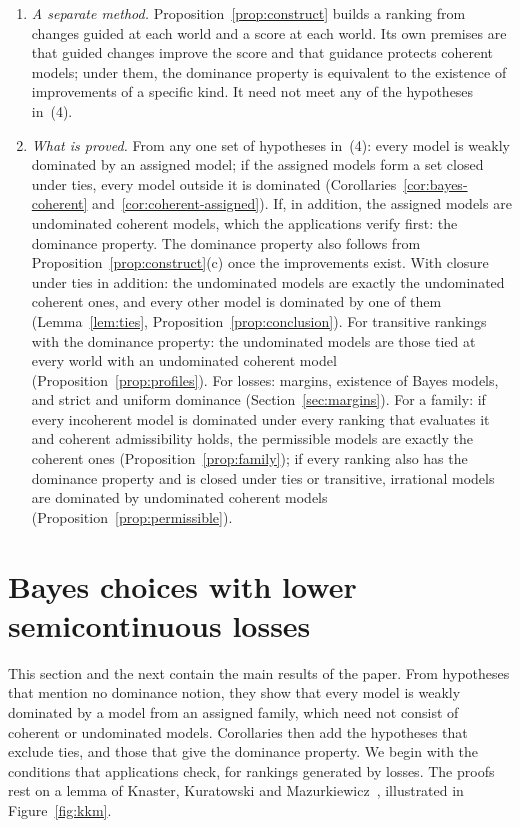 \documentclass[11pt]{article}
\theoremstyle{definition}
\theoremstyle{remark}
\begin{document}
\begin{enumerate}[label=(\arabic*),leftmargin=*]
\item \emph{A separate method.} Proposition~\ref{prop:construct} builds a ranking from changes guided at each world and a score at each world. Its own premises are that guided changes improve the score and that guidance protects coherent models; under them, the dominance property is equivalent to the existence of improvements of a specific kind. It need not meet any of the hypotheses in~(4).
\item \emph{What is proved.} From any one set of hypotheses in~(4): every model is weakly dominated by an assigned model; if the assigned models form a set closed under ties, every model outside it is dominated (Corollaries~\ref{cor:bayes-coherent} and~\ref{cor:coherent-assigned}). If, in addition, the assigned models are undominated coherent models, which the applications verify first: the dominance property. The dominance property also follows from Proposition~\ref{prop:construct}(c) once the improvements exist. With closure under ties in addition: the undominated models are exactly the undominated coherent ones, and every other model is dominated by one of them (Lemma~\ref{lem:ties}, Proposition~\ref{prop:conclusion}). For transitive rankings with the dominance property: the undominated models are those tied at every world with an undominated coherent model (Proposition~\ref{prop:profiles}). For losses: margins, existence of Bayes models, and strict and uniform dominance (Section~\ref{sec:margins}). For a family: if every incoherent model is dominated under every ranking that evaluates it and coherent admissibility holds, the permissible models are exactly the coherent ones (Proposition~\ref{prop:family}); if every ranking also has the dominance property and is closed under ties or transitive, irrational models are dominated by undominated coherent models (Proposition~\ref{prop:permissible}).
\end{enumerate}

\section{Bayes choices with lower semicontinuous losses}\label{sec:bayes}

This section and the next contain the main results of the paper. From hypotheses that mention no dominance notion, they show that every model is weakly dominated by a model from an assigned family, which need not consist of coherent or undominated models. Corollaries then add the hypotheses that exclude ties, and those that give the dominance property. We begin with the conditions that applications check, for rankings generated by losses. The proofs rest on a lemma of Knaster, Kuratowski and Mazurkiewicz~\cite{KKM}, illustrated in Figure~\ref{fig:kkm}.
\end{document}
